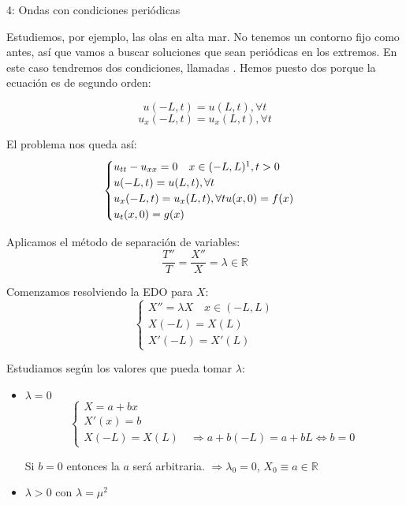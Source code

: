 
		\begin{example}{4: Ondas con condiciones periódicas}\label{ec:ondas}

			Estudiemos, por ejemplo, las olas en alta mar. No tenemos un contorno fijo como antes, así que vamos a buscar soluciones que sean periódicas en los extremos. En este caso tendremos dos condiciones, llamadas . Hemos puesto dos porque la ecuación es de segundo orden:

			\[u(-L,t) = u(L,t), \forall t\]
			\[u_x(-L,t) = u_x(L,t), \forall t\]

			El problema nos queda así:
			\[  \begin{cases}
				u_{tt} - u_{xx} = 0 \quad x  \in (-L,L)\footnotemark, t>0\\
				u(-L,t) = u(L,t), \forall t\\
				u_x(-L,t) = u_x(L,t), \forall t
				u(x,0) = f(x) \\
				u_t(x,0) = g(x)
				\end{cases}
			\]

			Aplicamos el método de separación de variables:
			\[ \frac{T''}{T} = \frac{X''}{X} = \lambda \in \mathbb{R}\]

			Comenzamos resolviendo la EDO para $X$:
			\[\left\{\begin{array}{l}
				X'' = \lambda X \quad x \in (-L,L) \\
				X(-L) = X(L) \\
				X'(-L) = X'(L)
			\end{array}
			\right. \]

			Estudiamos según los valores que pueda tomar $\lambda$:
			\begin{itemize}
				\item $\lambda = 0$
					\[\left\{\begin{array}{l}
						X = a+bx \\
						X'(x) = b \\
						X(-L) = X(L) \quad \Rightarrow a + b(-L) = a + bL \Leftrightarrow b = 0
					\end{array}
					\right. \]

					Si $b = 0$ entonces la $a$ será arbitraria. $\Rightarrow \lambda_0 = 0$, $ X_0 \equiv a \in \mathbb{R}$


				\item $\lambda > 0$ con $\lambda = \mu^2$


\end{itemize}
\end{example}
